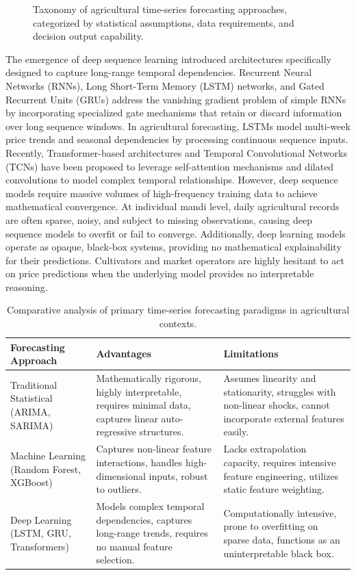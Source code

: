 \documentclass[12pt,a4paper]{report}
\theoremstyle{definition}
\theoremstyle{remark}
\begin{document}
\begin{figure}[htbp]
    \centering
    \caption{Taxonomy of agricultural time-series forecasting approaches, categorized by statistical assumptions, data requirements, and decision output capability.}
    \label{fig:forecasting_taxonomy}
\end{figure}

The emergence of deep sequence learning introduced architectures specifically designed to capture long-range temporal dependencies. Recurrent Neural Networks (RNNs), Long Short-Term Memory (LSTM) networks, and Gated Recurrent Units (GRUs) address the vanishing gradient problem of simple RNNs by incorporating specialized gate mechanisms that retain or discard information over long sequence windows. In agricultural forecasting, LSTMs model multi-week price trends and seasonal dependencies by processing continuous sequence inputs. Recently, Transformer-based architectures and Temporal Convolutional Networks (TCNs) have been proposed to leverage self-attention mechanisms and dilated convolutions to model complex temporal relationships. However, deep sequence models require massive volumes of high-frequency training data to achieve mathematical convergence. At individual mandi level, daily agricultural records are often sparse, noisy, and subject to missing observations, causing deep sequence models to overfit or fail to converge. Additionally, deep learning models operate as opaque, black-box systems, providing no mathematical explainability for their predictions. Cultivators and market operators are highly hesitant to act on price predictions when the underlying model provides no interpretable reasoning.

\begin{table}[htbp]
\centering
\caption{Comparative analysis of primary time-series forecasting paradigms in agricultural contexts.}
\label{tab:forecasting_comparison}
\begin{tabular}{p{3.5cm}|p{5.5cm}|p{5.5cm}}
\hline
\textbf{Forecasting Approach} & \textbf{Advantages} & \textbf{Limitations} \\
\hline
Traditional Statistical (ARIMA, SARIMA) & Mathematically rigorous, highly interpretable, requires minimal data, captures linear auto-regressive structures. & Assumes linearity and stationarity, struggles with non-linear shocks, cannot incorporate external features easily. \\
\hline
Machine Learning (Random Forest, XGBoost) & Captures non-linear feature interactions, handles high-dimensional inputs, robust to outliers. & Lacks extrapolation capacity, requires intensive feature engineering, utilizes static feature weighting. \\
\hline
Deep Learning (LSTM, GRU, Transformers) & Models complex temporal dependencies, captures long-range trends, requires no manual feature selection. & Computationally intensive, prone to overfitting on sparse data, functions as an uninterpretable black box. \\
\hline
\end{tabular}
\end{table}
\end{document}
